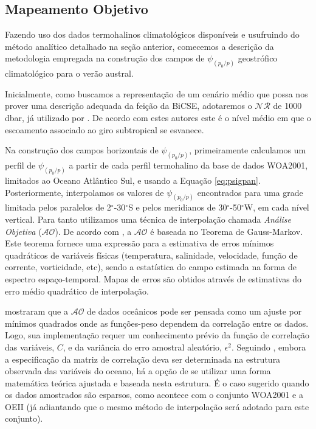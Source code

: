 \subsection{Mapeamento Objetivo} \label{sec:psigeo_AO}

\hspace{6mm} Fazendo uso dos dados termohalinos climatológicos disponíveis e usufruindo do método analítico 
detalhado na seção anterior, comecemos a descrição da metodologia empregada
na construção dos campos de $\psi_{(p_0/p)}$ geostrófico climatológico para o verão austral.

Inicialmente, como buscamos a representação de um cenário 
médio que possa nos prover uma descrição adequada da feição da BiCSE, adotaremos o $\mathcal{NR}$ de 1000 dbar, 
já utilizado por \cite{rodrigues_etal2006}. De acordo com estes autores este é o nível médio em que o escoamento associado ao 
giro subtropical se esvanece. 

Na construção dos campos horizontais de $\psi_{(p_0/p)}$, primeiramente calculamos um perfil de $\psi_{(p_0/p)}$ a partir de 
cada perfil termohalino da base de dados WOA2001, limitados ao Oceano Atlântico Sul, e usando 
a Equação \ref{eq:psigpan}. Posteriormente, interpolamos os valores de $\psi_{(p_0/p)}$ encontrados para uma 
grade limitada pelos paralelos de 2$^\circ$-30$^\circ$S e pelos meridianos de 30$^\circ$-50$^\circ$W, em cada
nível vertical. Para tanto
utilizamos uma técnica de interpolação chamada 
\textit{Análise Objetiva} ($\mathcal{AO}$). De acordo com 
\cite{bretherton_etal1976}, a $\mathcal{AO}$ é baseada no Teorema 
de Gauss-Markov. Este teorema fornece uma expressão para a estimativa de erros mínimos 
quadráticos de variáveis físicas (temperatura, salinidade, velocidade, função de corrente, 
vorticidade, etc), sendo a estatística do campo estimada na forma de espectro espaço-temporal. 
Mapas de erros são obtidos através de estimativas do erro médio quadrático de interpolação. 

\cite{carter_robinson1987} mostraram que a $\mathcal{AO}$ de dados oceânicos pode ser pensada 
como um ajuste por mínimos quadrados onde as funções-peso dependem da correlação entre os dados. 
Logo, sua implementação requer um conhecimento prévio da função de correlação das 
variáveis, $C$, e da variância do erro amostral aleatório, $\epsilon^2$. Seguindo 
\cite{emery_thomson1998}, embora a especificação da matriz de correlação deva ser determinada na 
estrutura observada das variáveis do oceano, há a opção de se utilizar uma forma matemática teórica 
ajustada e baseada nesta estrutura. É o caso sugerido quando os dados amostrados são esparsos, 
como acontece com o conjunto WOA2001 e a OEII (já adiantando que o mesmo método de 
interpolação será adotado para este conjunto).


